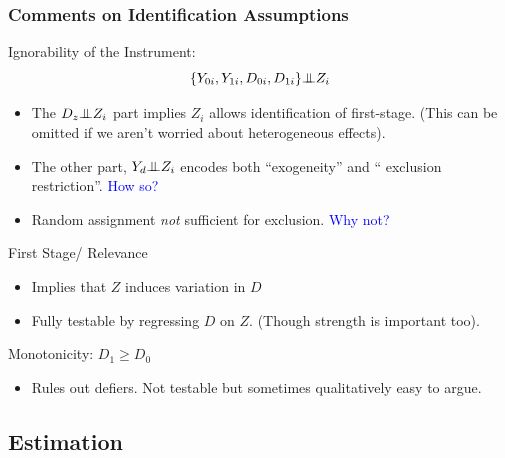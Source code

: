 \documentclass[xcolor=dvipsnames]{beamer}
\newcommand{\indep}{{\bot\negthickspace\negthickspace\bot}}
\begin{document}
\begin{frame}
 \frametitle{Comments on Identification Assumptions}
\small
{} Ignorability of the Instrument: $$\{ Y_{0i},Y_{1i}, D_{0i},D_{1i} \} \indep Z_i$$
\footnotesize
\begin{itemize}
\item<2-> The $D_z  \indep Z_i$ part implies $Z_i$ allows identification of first-stage. 
(This can be omitted if we aren't worried about heterogeneous effects).
\item<3-> The other part, $Y_d \indep Z_i$  encodes both ``exogeneity'' and `` exclusion restriction''.  \textcolor{Blue}{How so?}  %
\item<4-> Random assignment \textit{not} sufficient for exclusion. \textcolor{Blue}{Why not?}
\end{itemize}
\bigskip
\small
{} First Stage/ Relevance \\
\small
\footnotesize

\begin{itemize}
\item Implies that $Z$ induces variation in $D$
\item Fully testable by regressing $D$ on $Z$. (Though strength is important too). 
\end{itemize}\bigskip
\small
{} Monotonicity: $D_{1} \geq D_{0}$\\
\footnotesize
\begin{itemize}
\item Rules out defiers. Not testable but sometimes qualitatively easy to argue.
\end{itemize}
\end{frame}

\subsection{Estimation}
\end{document}
